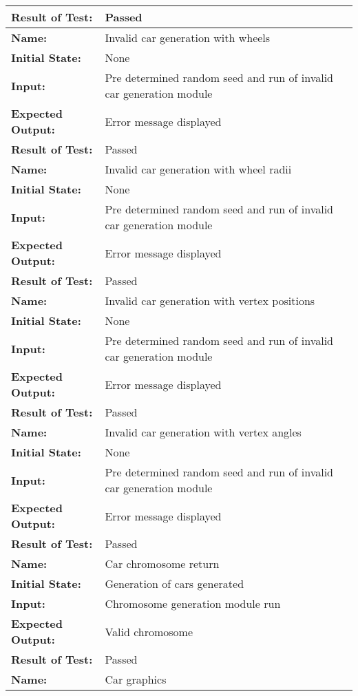 \documentclass[12pt, titlepage]{article}
\begin{document}
\begin{center}
\begin{longtable}{ l | p{10cm} }
\textbf{Result of Test:} & Passed\\
\hline
\rule{0pt}{1.5em}\textbf{Name:} & Invalid car generation with wheels\\
\textbf{Initial State:} & None\\
\textbf{Input:} & Pre determined random seed and run of invalid car generation 
module\\
\textbf{Expected Output:} & Error message displayed\\[0.6em]
\textbf{Result of Test:} & Passed\\
\hline
\rule{0pt}{1.5em}\textbf{Name:} & Invalid car generation with wheel radii\\
\textbf{Initial State:} & None\\
\textbf{Input:} & Pre determined random seed and run of invalid car generation 
module\\
\textbf{Expected Output:} & Error message displayed\\[0.6em]
\textbf{Result of Test:} & Passed\\
\hline
\rule{0pt}{1.5em}\textbf{Name:} & Invalid car generation with vertex positions\\
\textbf{Initial State:} & None\\
\textbf{Input:} & Pre determined random seed and run of invalid car generation 
module\\
\textbf{Expected Output:} & Error message displayed\\[0.6em]
\textbf{Result of Test:} & Passed\\
\hline
\rule{0pt}{1.5em}\textbf{Name:} & Invalid car generation with vertex angles\\
\textbf{Initial State:} & None\\
\textbf{Input:} & Pre determined random seed and run of invalid car generation 
module\\
\textbf{Expected Output:} &Error message displayed\\[0.6em]
\textbf{Result of Test:} & Passed\\
\hline
\rule{0pt}{1.5em}\textbf{Name:} & Car chromosome return\\
\textbf{Initial State:} & Generation of cars generated\\
\textbf{Input:} & Chromosome generation module run\\
\textbf{Expected Output:} & Valid chromosome\\[0.6em]
\textbf{Result of Test:} & Passed\\
\hline
\rule{0pt}{1.5em}\textbf{Name:} & Car graphics\\

\end{longtable}
\end{center}
\end{document}
